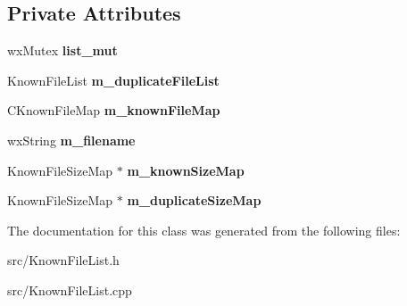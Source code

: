 \subsection*{Private Attributes}
\begin{DoxyCompactItemize}
\item 
wxMutex {\bfseries list\_\-mut}\label{classCKnownFileList_a3dfd8bb875ac77a5723c731266e1b610}

\item 
KnownFileList {\bfseries m\_\-duplicateFileList}\label{classCKnownFileList_ade2dfbad20ceac68f6794cb628ac93bf}

\item 
CKnownFileMap {\bfseries m\_\-knownFileMap}\label{classCKnownFileList_a73f61977bac871919fc284749b167ddd}

\item 
wxString {\bfseries m\_\-filename}\label{classCKnownFileList_adfd74ec5b7e791dad256f2c7ddc60710}

\item 
KnownFileSizeMap $\ast$ {\bfseries m\_\-knownSizeMap}\label{classCKnownFileList_a87d0a281ce5ae4a816d32e220367b0b7}

\item 
KnownFileSizeMap $\ast$ {\bfseries m\_\-duplicateSizeMap}\label{classCKnownFileList_a3929137142c6ada7757af42f461152fb}

\end{DoxyCompactItemize}


The documentation for this class was generated from the following files:\begin{DoxyCompactItemize}
\item 
src/KnownFileList.h\item 
src/KnownFileList.cpp\end{DoxyCompactItemize}
